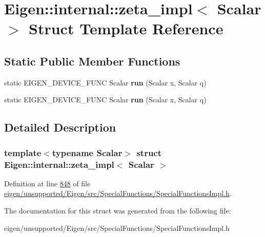 \hypertarget{struct_eigen_1_1internal_1_1zeta__impl}{}\section{Eigen\+:\+:internal\+:\+:zeta\+\_\+impl$<$ Scalar $>$ Struct Template Reference}
\label{struct_eigen_1_1internal_1_1zeta__impl}
\subsection*{Static Public Member Functions}
\begin{DoxyCompactItemize}
\item 
\mbox{\label{struct_eigen_1_1internal_1_1zeta__impl_aaaa827d91c57ba405baad9ab453931dd}} 
static E\+I\+G\+E\+N\+\_\+\+D\+E\+V\+I\+C\+E\+\_\+\+F\+U\+NC Scalar {\bfseries run} (Scalar x, Scalar q)
\item 
\mbox{\label{struct_eigen_1_1internal_1_1zeta__impl_aaaa827d91c57ba405baad9ab453931dd}} 
static E\+I\+G\+E\+N\+\_\+\+D\+E\+V\+I\+C\+E\+\_\+\+F\+U\+NC Scalar {\bfseries run} (Scalar x, Scalar q)
\end{DoxyCompactItemize}


\subsection{Detailed Description}
\subsubsection*{template$<$typename Scalar$>$\newline
struct Eigen\+::internal\+::zeta\+\_\+impl$<$ Scalar $>$}



Definition at line \hyperlink{eigen_2unsupported_2_eigen_2src_2_special_functions_2_special_functions_impl_8h_source_l00848}{848} of file \hyperlink{eigen_2unsupported_2_eigen_2src_2_special_functions_2_special_functions_impl_8h_source}{eigen/unsupported/\+Eigen/src/\+Special\+Functions/\+Special\+Functions\+Impl.\+h}.



The documentation for this struct was generated from the following file\+:\begin{DoxyCompactItemize}
\item 
eigen/unsupported/\+Eigen/src/\+Special\+Functions/\+Special\+Functions\+Impl.\+h\end{DoxyCompactItemize}
